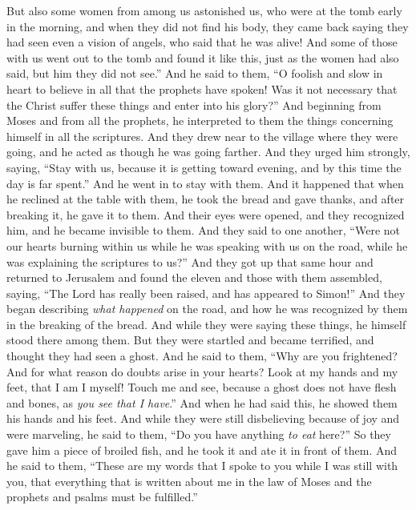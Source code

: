 \begin{biblechapter}
\verse But also some women from among us astonished us, who were at the tomb early in the morning,
\verse and when they did not find his body, they came back saying they had seen even a vision of angels, who said that he was alive!
\verse And some of those with us went out to the tomb and found it like this, just as the women had also said, but him they did not see.”
\verse And he said to them, “O foolish and slow in heart to believe in all that the prophets have spoken!
\verse Was it not necessary that the Christ suffer these things and enter into his glory?”
\verse And beginning from Moses and from all the prophets, he interpreted to them the things concerning himself in all the scriptures.
\verse And they drew near to the village where they were going, and he acted as though he was going farther.
\verse And they urged him strongly, saying, “Stay with us, because it is getting toward evening, and by this time the day is far spent.” And he went in to stay with them.
\verse And it happened that when he reclined at the table with them, he took the bread and gave thanks, and after breaking it, he gave it to them.
\verse And their eyes were opened, and they recognized him, and he became invisible to them.
\verse And they said to one another, “Were not our hearts burning within us while he was speaking with us on the road, while he was explaining the scriptures to us?”
\verse And they got up that same hour and returned to Jerusalem and found the eleven and those with them assembled,
\verse saying, “The Lord has really been raised, and has appeared to Simon!”
\verse And they began describing \textit{what happened} on the road, and how he was recognized by them in the breaking of the bread.
 And while they were saying these things, he himself stood there among them.
\verse But they were startled and became terrified, and thought they had seen a ghost.
\verse And he said to them, “Why are you frightened? And for what reason do doubts arise in your hearts?
\verse Look at my hands and my feet, that I am I myself! Touch me and see, because a ghost does not have flesh and bones, as \textit{you see that I have}.”
\verse And when he had said this, he showed them his hands and his feet.
\verse And while they were still disbelieving because of joy and were marveling, he said to them, “Do you have anything \textit{to eat} here?”
\verse So they gave him a piece of broiled fish,
\verse and he took it and ate it in front of them.
 And he said to them, “These are my words that I spoke to you while I was still with you, that everything that is written about me in the law of Moses and the prophets and psalms must be fulfilled.”

\end{biblechapter}

